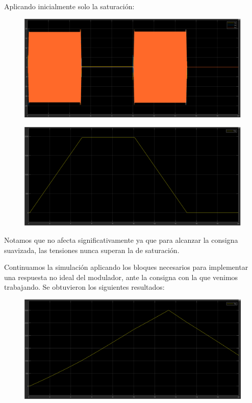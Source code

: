 \documentclass{article}
\begin{document}
Aplicando inicialmente solo la saturación:

\begin{figure}[H]
    \centering
    \includegraphics[width=1\textwidth]{5.2.5.e.1.png}
\end{figure}

\begin{figure}[H]
    \centering
    \includegraphics[width=1\textwidth]{5.2.5.e.2.png}
\end{figure}

Notamos que no afecta significativamente ya que para alcanzar la consigna suavizada, las tensiones 
nunca superan la de saturación.

Continuamos la simulación aplicando los bloques necesarios para implementar una respuesta no ideal 
del modulador, ante la consigna con la que venimos trabajando. Se obtuvieron los siguientes 
resultados:

\begin{figure}[H]
    \centering
    \includegraphics[width=1\textwidth]{5.2.5.e.3.png}
\end{figure}
\end{document}
